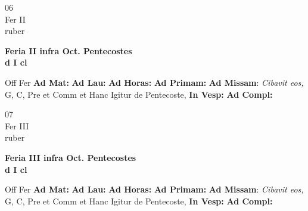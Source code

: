 \documentclass[10pt, openany]{book}
\begin{document}
    \begin{center}
        \begin{minipage}{3.5in}
            \vspace{2em}
            \begin{minipage}{0.5in}
                {\Huge 06} \\
                {\normalsize Fer II} \\
                {\normalsize ruber}
            \end{minipage}
            \begin{minipage}{3.0in}
                \textbf{ \large Feria II infra Oct. Pentecostes \\
                \textnormal{\normalsize d I cl}} \\ 
            \end{minipage}
            \begin{justify}Off Fer
                \textbf{Ad Mat: }
                \textbf{Ad Lau: }
                \textbf{Ad Horas: }
                \textbf{Ad Primam: }\textbf{Ad Missam}: \textit{Cibavit eos,} G, C, Pre et Comm et Hanc Igitur de Pentecoste,  
                \textbf{In Vesp: }
                \textbf{Ad Compl: }
            \end{justify}
        \end{minipage}
    \end{center}

    \begin{center}
        \begin{minipage}{3.5in}
            \vspace{2em}
            \begin{minipage}{0.5in}
                {\Huge 07} \\
                {\normalsize Fer III} \\
                {\normalsize ruber}
            \end{minipage}
            \begin{minipage}{3.0in}
                \textbf{ \large Feria III infra Oct. Pentecostes \\
                \textnormal{\normalsize d I cl}} \\ 
            \end{minipage}
            \begin{justify}Off Fer
                \textbf{Ad Mat: }
                \textbf{Ad Lau: }
                \textbf{Ad Horas: }
                \textbf{Ad Primam: }\textbf{Ad Missam}: \textit{Cibavit eos,} G, C, Pre et Comm et Hanc Igitur de Pentecoste,  
                \textbf{In Vesp: }
                \textbf{Ad Compl: }
            \end{justify}
        \end{minipage}
    \end{center}
\end{document}
